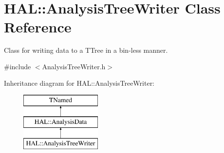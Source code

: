 \hypertarget{class_h_a_l_1_1_analysis_tree_writer}{\section{H\+A\+L\+:\+:Analysis\+Tree\+Writer Class Reference}
\label{class_h_a_l_1_1_analysis_tree_writer}
}


Class for writing data to a T\+Tree in a bin-\/less manner.  




{\ttfamily \#include $<$Analysis\+Tree\+Writer.\+h$>$}

Inheritance diagram for H\+A\+L\+:\+:Analysis\+Tree\+Writer\+:\begin{figure}[H]
\begin{center}
\leavevmode
\includegraphics[height=3.000000cm]{class_h_a_l_1_1_analysis_tree_writer}
\end{center}
\end{figure}
